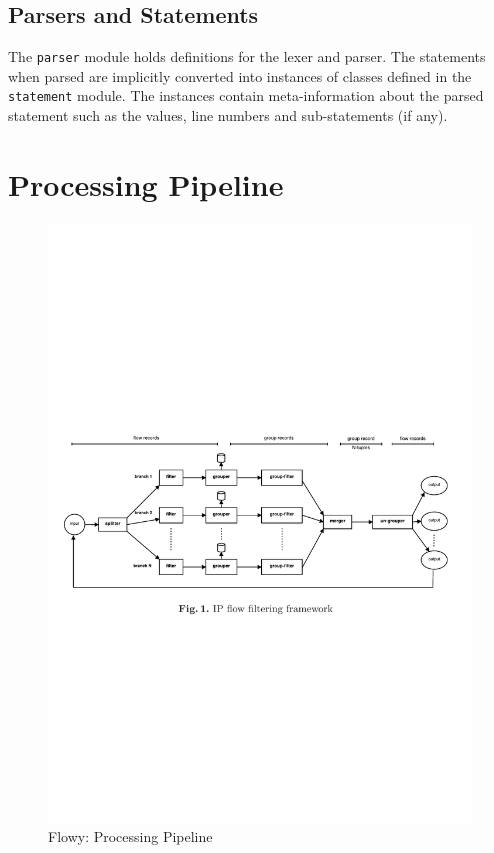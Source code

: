 \subsection{Parsers and Statements}\label{subsec:parsers-statements}
The \texttt{parser} module holds definitions for the lexer and parser. The statements when parsed are implicitly converted into instances of classes defined in the \texttt{statement} module. The instances contain meta-information about the parsed statement such as the values, line numbers and sub-statements (if any).

\section{Processing Pipeline}\label{sec:processing-pipeline}
\begin{figure}[h!]	
\begin{center}
  \includegraphics* [width=1.0\linewidth]{figures/flowy-pipeline}	
  \caption{Flowy: Processing Pipeline \cite{vmarinov:2009}}
  \label{fig:flowy-pipeline}
\end{center}
\end{figure}

